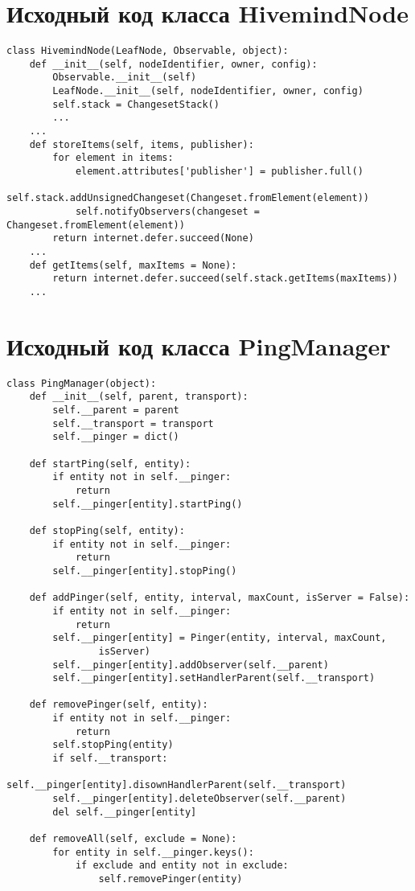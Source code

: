 \newpage
\appendix
{}
\chapter{Исходный код класса HivemindNode}
\label{ap:HivemindNode}
\begin{lstlisting}
class HivemindNode(LeafNode, Observable, object):
    def __init__(self, nodeIdentifier, owner, config):
        Observable.__init__(self)
        LeafNode.__init__(self, nodeIdentifier, owner, config)
        self.stack = ChangesetStack()
        ...
    ...
    def storeItems(self, items, publisher):
        for element in items:
            element.attributes['publisher'] = publisher.full()
            self.stack.addUnsignedChangeset(Changeset.fromElement(element))
            self.notifyObservers(changeset = Changeset.fromElement(element))
        return internet.defer.succeed(None)
    ...
    def getItems(self, maxItems = None):
        return internet.defer.succeed(self.stack.getItems(maxItems))
    ...
\end{lstlisting}

\chapter{Исходный код класса PingManager}
\label{ap:PingManager}
\begin{lstlisting}
class PingManager(object):
    def __init__(self, parent, transport):
        self.__parent = parent
        self.__transport = transport
        self.__pinger = dict()

    def startPing(self, entity):
        if entity not in self.__pinger:
            return
        self.__pinger[entity].startPing()

    def stopPing(self, entity):
        if entity not in self.__pinger:
            return
        self.__pinger[entity].stopPing()

    def addPinger(self, entity, interval, maxCount, isServer = False):
        if entity not in self.__pinger:
            return
        self.__pinger[entity] = Pinger(entity, interval, maxCount,
                isServer)
        self.__pinger[entity].addObserver(self.__parent)
        self.__pinger[entity].setHandlerParent(self.__transport)

    def removePinger(self, entity):
        if entity not in self.__pinger:
            return
        self.stopPing(entity)
        if self.__transport:
            self.__pinger[entity].disownHandlerParent(self.__transport)
        self.__pinger[entity].deleteObserver(self.__parent)
        del self.__pinger[entity]

    def removeAll(self, exclude = None):
        for entity in self.__pinger.keys():
            if exclude and entity not in exclude:
                self.removePinger(entity)
\end{lstlisting}

